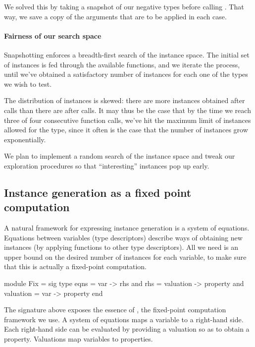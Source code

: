 We solved this by taking a snapshot of our negative types before calling
. That way, we save a copy of the arguments that are to be applied
in each  case.

\paragraph{Fairness of our search space}
Snapshotting enforces a breadth-first search of the instance space. The initial
set of instances is fed through the available functions, and we iterate the
process, until we've obtained a satisfactory number of instances for each one of
the types we wish to test.

The distribution of instances is skewed: there are more instances obtained after
 calls than there are after  calls. It may thus be the case
that by the time we reach three of four consecutive function calls, we've hit
the maximum limit of instances allowed for the type, since it often is the case
that the number of instances grow exponentially.

We plan to implement a random search of the instance space and tweak our
exploration procedures so that ``interesting'' instances pop up early.

\subsection{Instance generation as a fixed point computation}
A natural framework for expressing instance generation is a system of equations.
Equations between variables (type descriptors) describe ways of obtaining new
instances (by applying functions to other type descriptors). All we need is an
upper bound on the desired number of instances for each variable, to make sure
that this is actually a fixed-point computation.
%
\begin{ocamlcode}
module Fix = sig
  type     eqns = var -> rhs
  and       rhs = valuation -> property
  and valuation = var -> property
end
\end{ocamlcode}
%
The signature above exposes the essence of , the fixed-point computation
framework we use. A system of equations maps a variable to a right-hand side.
Each right-hand side can be evaluated by providing a valuation so as to obtain a
property. Valuations map variables to properties.

